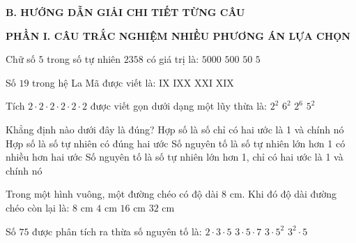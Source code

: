 \documentclass[12pt,a4paper]{article}
\begin{document}
\noindent\textbf{\large B. HƯỚNG DẪN GIẢI CHI TIẾT TỪNG CÂU}
\vspace{2mm}

\noindent\textbf{\large PHẦN I. CÂU TRẮC NGHIỆM NHIỀU PHƯƠNG ÁN LỰA CHỌN}
\vspace{1mm}
\begin{ex}
Chữ số $5$ trong số tự nhiên $2358$ có giá trị là:
\choice
{$5000$}
{$500$}
{\True $50$}
{$5$}
\end{ex}

\begin{ex}
Số $19$ trong hệ La Mã được viết là:
\choice
{IX}
{IXX}
{XXI}
{\True XIX}
\end{ex}

\begin{ex}
Tích $2 \cdot 2 \cdot 2 \cdot 2 \cdot 2 \cdot 2$ được viết gọn dưới dạng một lũy thừa là:
\choice
{$2^2$}
{$6^2$}
{\True $2^6$}
{$5^2$}
\end{ex}

\begin{ex}
Khẳng định nào dưới đây là đúng?
\choice
{Hợp số là số chỉ có hai ước là 1 và chính nó}
{Hợp số là số tự nhiên có đúng hai ước}
{Số nguyên tố là số tự nhiên lớn hơn 1 có nhiều hơn hai ước}
{\True Số nguyên tố là số tự nhiên lớn hơn 1, chỉ có hai ước là 1 và chính nó}
\end{ex}

\begin{ex}
Trong một hình vuông, một đường chéo có độ dài $8\text{ cm}$. Khi đó độ dài đường chéo còn lại là:
\choice
{\True $8\text{ cm}$}
{$4\text{ cm}$}
{$16\text{ cm}$}
{$32\text{ cm}$}
\end{ex}

\begin{ex}
Số $75$ được phân tích ra thừa số nguyên tố là:
\choice
{$2 \cdot 3 \cdot 5$}
{$3 \cdot 5 \cdot 7$}
{\True $3 \cdot 5^2$}
{$3^2 \cdot 5$}
\end{ex}
\end{document}
